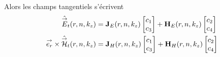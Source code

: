     \begin{prop}
        Alors les champs tangentiels s'écrivent
        \begin{subequations}
            \begin{align}
                \hat {{\overset{\rightarrow}{E}}}_t(r,n,k_z) &= \mathbf{J}_{E}(r,n,k_z)
                \begin{bmatrix}
                    c_1 \\
                    c_3
                \end{bmatrix}
                +
                \mathbf{H}_{E}(r,n,k_z)
                \begin{bmatrix}
                    c_2 \\
                    c_4
                \end{bmatrix}
                \label{eq:imp_fourier:cylindre:Et}\\
                {\overset{\rightarrow}{e_r}}\times\hat {{\overset{\rightarrow}{\mathcal{H}}}}_t(r,n,k_z) &= 
                \mathbf{J}_{H}(r,n,k_z)
                \begin{bmatrix}
                    c_1 \\
                    c_3
                \end{bmatrix}
                +
                \mathbf{H}_{H}(r,n,k_z)
                \begin{bmatrix}
                    c_2 \\
                    c_4
                \end{bmatrix}
                \label{eq:imp_fourier:cylindre:Ht}
            \end{align}
        \end{subequations}
    \end{prop}


